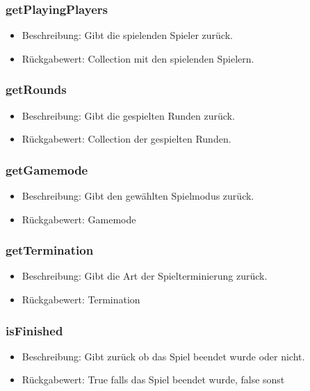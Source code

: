 \documentclass[a4paper]{scrreprt}
\begin{document}
    \subsubsection{getPlayingPlayers}
    \begin{itemize}
        \item Beschreibung: Gibt die spielenden Spieler zurück.
        \item Rückgabewert: Collection mit den spielenden Spielern.
    \end{itemize}

    \subsubsection{getRounds}
    \begin{itemize}
        \item Beschreibung: Gibt die gespielten Runden zurück.
        \item Rückgabewert: Collection der gespielten Runden.
    \end{itemize}

    \subsubsection{getGamemode}
    \begin{itemize}
        \item Beschreibung: Gibt den gewählten Spielmodus zurück.
        \item Rückgabewert: Gamemode
    \end{itemize}

    \subsubsection{getTermination}
    \begin{itemize}
        \item Beschreibung: Gibt die Art der Spielterminierung zurück.
        \item Rückgabewert: Termination
    \end{itemize}

    \subsubsection{isFinished}
    \begin{itemize}
        \item Beschreibung: Gibt zurück ob das Spiel beendet wurde oder nicht.
        \item Rückgabewert: True falls das Spiel beendet wurde, false sonst
    \end{itemize}
\end{document}
